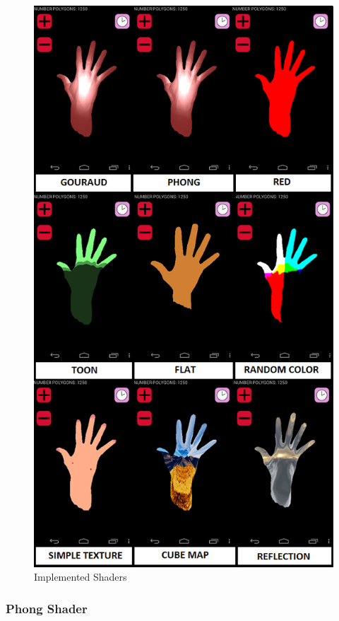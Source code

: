 \documentclass[10pt, conference, compsocconf]{IEEEtran}
\begin{document}
{	\begin{figure}[!t]
	\centering
		\includegraphics[keepaspectratio=true,scale=0.4]{shaders_impl.png}
	\caption{Implemented Shaders}
	\label{shaders_impl}
	\end{figure}

\subsubsection{Phong Shader}

}
\end{document}
